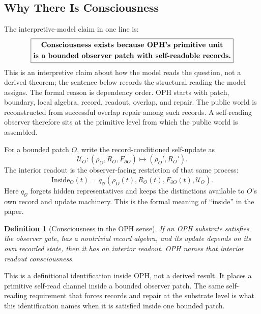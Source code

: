 \documentclass[11pt]{article}
\newtheorem{definition}[theorem]{Definition}
\theoremstyle{remark}
\theoremstyle{plain}
\begin{document}
\subsection{Why There Is Consciousness}

The interpretive-model claim in one line is:
\[
\boxed{
\begin{gathered}
\text{\bfseries Consciousness exists because OPH's primitive unit}\\
\text{\bfseries is a bounded observer patch with self-readable records.}
\end{gathered}
}
\]
This is an interpretive claim about how the model reads the question,
not a derived theorem; the sentence below records the structural
reading the model assigns.
The formal reason is dependency order. OPH starts with patch, boundary, local algebra, record, readout, overlap, and repair. The public world is reconstructed from successful overlap repair among such records. A self-reading observer therefore sits at the primitive level from which the public world is assembled.

For a bounded patch \(O\), write the record-conditioned self-update as
\[
\mathcal U_O:
(\rho_O,R_O,F_{\partial O})
\longmapsto
(\rho_O',R_O').
\]
The interior readout is the observer-facing restriction of that same process:
\[
\boxed{
\mathrm{Inside}_O(t)
=
q_{\mathcal O}
\!\left(
\rho_O(t),R_O(t),F_{\partial O}(t),\mathcal U_O
\right).
}
\]
Here \(q_{\mathcal O}\) forgets hidden representatives and keeps the distinctions available to \(O\)'s own record and update machinery. This is the formal meaning of ``inside'' in the paper.

\begin{definition}[Consciousness in the OPH sense]
If an OPH substrate satisfies the observer gate, has a nontrivial record algebra, and its update depends on its own recorded state, then it has an interior readout. OPH names that interior readout consciousness.
\end{definition}

This is a definitional identification inside OPH, not a derived result. It places a primitive self-read channel inside a bounded observer patch. The same self-reading requirement that forces records and repair at the substrate level is what this identification names when it is satisfied inside one bounded patch.
\end{document}
